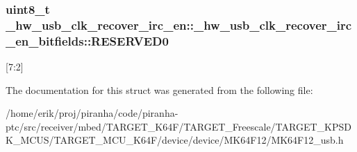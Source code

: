 \subsubsection[{\texorpdfstring{R\+E\+S\+E\+R\+V\+E\+D0}{RESERVED0}}]{\setlength{\rightskip}{0pt plus 5cm}uint8\+\_\+t \+\_\+hw\+\_\+usb\+\_\+clk\+\_\+recover\+\_\+irc\+\_\+en\+::\+\_\+hw\+\_\+usb\+\_\+clk\+\_\+recover\+\_\+irc\+\_\+en\+\_\+bitfields\+::\+R\+E\+S\+E\+R\+V\+E\+D0}\hypertarget{struct__hw__usb__clk__recover__irc__en_1_1__hw__usb__clk__recover__irc__en__bitfields_a084b51143e0f34dc3eb0e898158e8cf3}{}\label{struct__hw__usb__clk__recover__irc__en_1_1__hw__usb__clk__recover__irc__en__bitfields_a084b51143e0f34dc3eb0e898158e8cf3}
\mbox{[}7\+:2\mbox{]} 

The documentation for this struct was generated from the following file\+:\begin{DoxyCompactItemize}
\item 
/home/erik/proj/piranha/code/piranha-\/ptc/src/receiver/mbed/\+T\+A\+R\+G\+E\+T\+\_\+\+K64\+F/\+T\+A\+R\+G\+E\+T\+\_\+\+Freescale/\+T\+A\+R\+G\+E\+T\+\_\+\+K\+P\+S\+D\+K\+\_\+\+M\+C\+U\+S/\+T\+A\+R\+G\+E\+T\+\_\+\+M\+C\+U\+\_\+\+K64\+F/device/device/\+M\+K64\+F12/M\+K64\+F12\+\_\+usb.\+h\end{DoxyCompactItemize}
